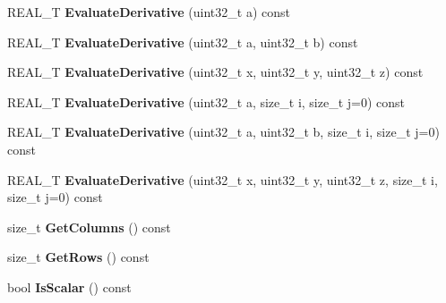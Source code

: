 \begin{DoxyCompactItemize}
\item 
\hypertarget{structatl_1_1_real_acbef29bf2238df385f08a79b64cd3f3e}{R\+E\+A\+L\+\_\+\+T {\bfseries Evaluate\+Derivative} (uint32\+\_\+t a) const }\label{structatl_1_1_real_acbef29bf2238df385f08a79b64cd3f3e}

\item 
\hypertarget{structatl_1_1_real_a75fa81c177d900427ed653422c954608}{R\+E\+A\+L\+\_\+\+T {\bfseries Evaluate\+Derivative} (uint32\+\_\+t a, uint32\+\_\+t b) const }\label{structatl_1_1_real_a75fa81c177d900427ed653422c954608}

\item 
\hypertarget{structatl_1_1_real_a1815b6e0510f3bf2a3f58f8a8c4191af}{R\+E\+A\+L\+\_\+\+T {\bfseries Evaluate\+Derivative} (uint32\+\_\+t x, uint32\+\_\+t y, uint32\+\_\+t z) const }\label{structatl_1_1_real_a1815b6e0510f3bf2a3f58f8a8c4191af}

\item 
\hypertarget{structatl_1_1_real_a6dc54d71b585d8120345d45f07d169f6}{R\+E\+A\+L\+\_\+\+T {\bfseries Evaluate\+Derivative} (uint32\+\_\+t a, size\+\_\+t i, size\+\_\+t j=0) const }\label{structatl_1_1_real_a6dc54d71b585d8120345d45f07d169f6}

\item 
\hypertarget{structatl_1_1_real_a7b0cc98e36edb3212be66d01c2b759b4}{R\+E\+A\+L\+\_\+\+T {\bfseries Evaluate\+Derivative} (uint32\+\_\+t a, uint32\+\_\+t b, size\+\_\+t i, size\+\_\+t j=0) const }\label{structatl_1_1_real_a7b0cc98e36edb3212be66d01c2b759b4}

\item 
\hypertarget{structatl_1_1_real_a9af356095d17f7173d85d8850159ecdc}{R\+E\+A\+L\+\_\+\+T {\bfseries Evaluate\+Derivative} (uint32\+\_\+t x, uint32\+\_\+t y, uint32\+\_\+t z, size\+\_\+t i, size\+\_\+t j=0) const }\label{structatl_1_1_real_a9af356095d17f7173d85d8850159ecdc}

\item 
\hypertarget{structatl_1_1_real_af08c2cd5341fa39e461c13251191081c}{size\+\_\+t {\bfseries Get\+Columns} () const }\label{structatl_1_1_real_af08c2cd5341fa39e461c13251191081c}

\item 
\hypertarget{structatl_1_1_real_a70d87c955e5b4566387b614ee6e81b6e}{size\+\_\+t {\bfseries Get\+Rows} () const }\label{structatl_1_1_real_a70d87c955e5b4566387b614ee6e81b6e}

\item 
\hypertarget{structatl_1_1_real_afa844d891d764e1ac8d0e78cccb78615}{bool {\bfseries Is\+Scalar} () const }\label{structatl_1_1_real_afa844d891d764e1ac8d0e78cccb78615}


\end{DoxyCompactItemize}

